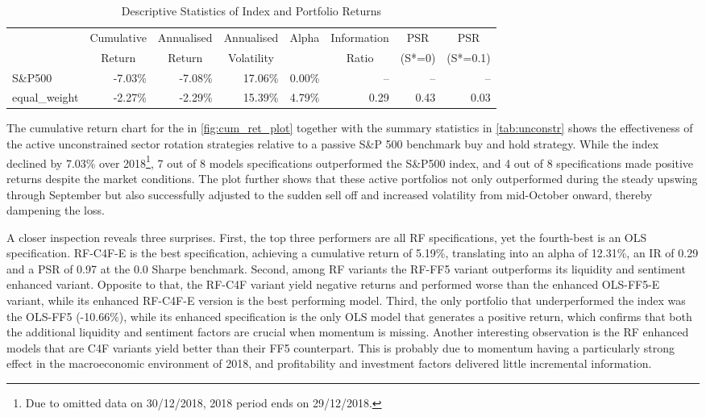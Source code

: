 \begin{table}[ht]
\centering
\caption{Descriptive Statistics of Index and Portfolio Returns}
\label{tab:return_stats_1}
\begin{tabular}{lrrrrrrr}
\toprule
{} & \multicolumn{1}{c}{Cumulative} & \multicolumn{1}{c}{Annualised} & \multicolumn{1}{c}{Annualised} & \multicolumn{1}{c}{Alpha} & \multicolumn{1}{c}{Information} & \multicolumn{1}{c}{PSR} & \multicolumn{1}{c}{PSR} \\
{} & \multicolumn{1}{c}{Return} & \multicolumn{1}{c}{Return} & \multicolumn{1}{c}{Volatility} & {} & \multicolumn{1}{c}{Ratio} & \multicolumn{1}{c}{(S*=0)} & \multicolumn{1}{c}{(S*=0.1)} \\
\midrule
S\&P500 & -7.03\% & -7.08\% & 17.06\% & 0.00\% & -- & -- & -- \\
equal\_weight & -2.27\% & -2.29\% & 15.39\% & 4.79\% & 0.29 & 0.43 & 0.03 \\
\bottomrule
\end{tabular}
\end{table}

The cumulative return chart for the in \cref{fig:cum_ret_plot} together with the summary statistics in \cref{tab:unconstr} shows the effectiveness of the active unconstrained sector rotation strategies relative to a passive S\&P 500 benchmark buy and hold strategy. While the index declined by 7.03\% over 2018\footnote{Due to omitted data on 30/12/2018, 2018 period ends on 29/12/2018.}, 7 out of 8 models specifications outperformed the S\&P500 index, and 4 out of 8 specifications made positive returns despite the market conditions. The plot further shows that these active portfolios not only outperformed during the steady upswing through September but also successfully adjusted to the sudden sell off and increased volatility from mid-October onward, thereby dampening the loss.

A closer inspection reveals three surprises. First, the top three performers are all RF specifications, yet the fourth-best is an OLS specification. RF-C4F-E is the best specification, achieving a cumulative return of 5.19\%, translating into an alpha of 12.31\%, an IR of 0.29 and a PSR of 0.97 at the 0.0 Sharpe benchmark.  Second, among RF variants the RF-FF5 variant outperforms its liquidity and sentiment enhanced variant. Opposite to that, the RF-C4F variant yield negative returns and performed worse than the enhanced OLS-FF5-E variant, while its enhanced RF-C4F-E version is the best performing model. Third,  the only portfolio that underperformed the index was the OLS-FF5 (-10.66\%), while its enhanced specification is the only OLS model that generates a positive return, which confirms that both the additional liquidity and sentiment factors are crucial when momentum is missing. Another interesting observation is the RF enhanced models that are C4F variants yield better than their FF5 counterpart. This is probably due to momentum having a particularly strong effect in the macroeconomic environment of 2018, and profitability and investment factors delivered little incremental information.

